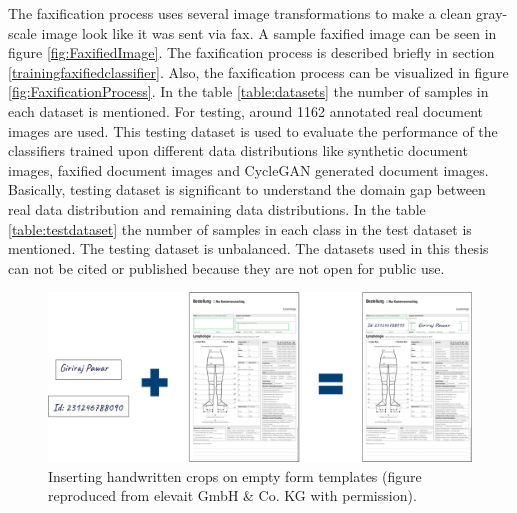 The faxification process uses several image transformations to make a clean gray-scale image look like it was sent via fax. A sample faxified image can be seen in figure \ref{fig:FaxifiedImage}. The faxification process is described briefly in section \ref{trainingfaxifiedclassifier}. Also, the faxification process can be visualized in figure \ref{fig:FaxificationProcess}. In the table \ref{table:datasets} the number of samples in each dataset is mentioned. For testing, around 1162 annotated real document images are used. This testing dataset is used to evaluate the performance of the classifiers trained upon different data distributions like synthetic document images, faxified document images and \ac{CycleGAN} generated document images. Basically, testing dataset is significant to understand the domain gap between real data distribution and remaining data distributions. In the table \ref{table:testdataset} the number of samples in each class in the test dataset is mentioned. The testing dataset is unbalanced. The datasets used in this thesis can not be cited or published because they are not open for public use.

\begin{figure}[H]
        \begin{center}
	    \includegraphics[scale=0.40]{images/Implementation/InsertHandwrittenCrops.png}
	    \caption[Inserting handwritten crops on empty form templates.]{Inserting handwritten crops on empty form templates (figure reproduced from elevait GmbH \& Co. KG with permission).}
	    \label{fig:InsertHandwrittenCrops}
	    \end{center}
\end{figure}





